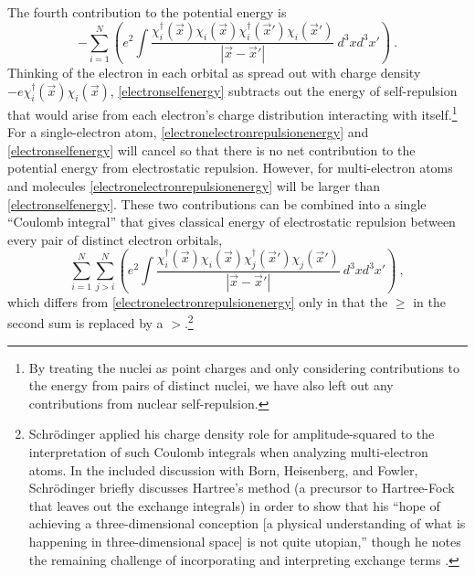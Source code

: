 \documentclass[12pt,onecolumn,secnumarabic,amsmath,amssymb,balancelastpage,nofootinbib]{article}
\begin{document}
The fourth contribution to the potential energy is
\begin{equation}
-\sum_{i=1}^{N}\left(e^2\int{\frac{\chi_i^{\dagger}(\vec{x})\chi_i(\vec{x})\chi_i^{\dagger}(\vec{x}')\chi_i(\vec{x}')}{|\vec{x}-\vec{x}'|}\  d^3 x d^3 x'}\right)
\ .
\label{electronselfenergy}
\end{equation}
Thinking of the electron in each orbital as spread out with charge density $-e\chi_i^{\dagger}(\vec{x})\chi_i(\vec{x})$, \eqref{electronselfenergy} subtracts out the energy of self-repulsion that would arise from each electron's charge distribution interacting with itself.\footnote{By treating the nuclei as point charges and only considering contributions to the energy from pairs of distinct nuclei, we have also left out any contributions from nuclear self-repulsion.}  For a single-electron atom,  \eqref{electronelectronrepulsionenergy} and \eqref{electronselfenergy} will cancel so that there is no net contribution to the potential energy from electrostatic repulsion.  However, for multi-electron atoms and molecules \eqref{electronelectronrepulsionenergy} will be larger than \eqref{electronselfenergy}.  These two contributions can be combined into a single ``Coulomb integral'' that gives classical energy of electrostatic repulsion between every pair of distinct electron orbitals,
\begin{equation}
\sum_{i=1}^{N}\sum_{j > i}^{N}\left(e^2\int{\frac{\chi_i^{\dagger}(\vec{x})\chi_i(\vec{x})\chi_j^{\dagger}(\vec{x}')\chi_j(\vec{x}')}{|\vec{x}-\vec{x}'|}\  d^3 x d^3 x'}\right)
\ ,
\label{coulombintegral}
\end{equation}
which differs from \eqref{electronelectronrepulsionenergy} only in that the $\geq$ in the second sum is replaced by a $>$.\footnote{Schr\"{o}dinger \cite[sec.\ 3]{schrodinger1928report} applied his charge density role for amplitude-squared to the interpretation of such Coulomb integrals when analyzing multi-electron atoms.  In the included discussion with Born, Heisenberg, and Fowler, Schr\"{o}dinger briefly discusses Hartree's method (a precursor to Hartree-Fock that leaves out the exchange integrals) in order to show that his ``hope of achieving a three-dimensional conception [a physical understanding of what is happening in three-dimensional space] is not quite utopian,'' though he notes the remaining challenge of incorporating and interpreting exchange terms \cite[pg.\ 428--429]{bacciagaluppi2009}.}
\end{document}

